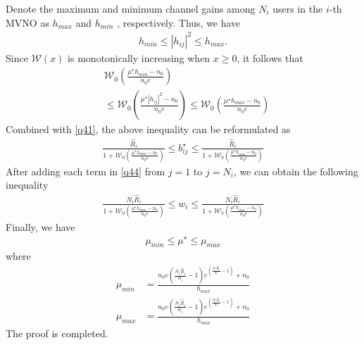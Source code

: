 \documentclass[journal]{IEEEtran}
\begin{document}
Denote the maximum and minimum channel gains among $N_i$ users in the $i$-th MVNO as $h_{max}$ and $h_{min}$  , respectively. Thus, we have
\begin{align}
h_{min} \leq \left|h_{ij}\right|^2 \leq h_{max}.
\end{align}
Since $\mathcal{W}\left(x\right)$ is monotonically increasing when $x \geq 0$, it follows that
\begin{align}
&\mathcal{W}_0\left(\frac{\mu^\star h_{min} - n_0}{n_0e}\right) \nonumber \\ & \leq  \mathcal{W}_0 \left(\frac{\mu^\star\left|h_{ij}\right|^2 - n_0}{n_0e}\right) \leq  \mathcal{W}_0\left(\frac{\mu^\star h_{max} - n_0}{n_0e}\right)
\end{align}
Combined with \eqref{q41}, the above inequality can be reformulated as
\begin{align}
\frac{\hat{R}_i}{1 + \mathcal{W}_0\left(\frac{\mu^\star h_{max} - n_0}{n_0e}\right)} \leq b_{ij}^\star \leq \frac{\hat{R}_i}{1 + \mathcal{W}_0\left(\frac{\mu^\star h_{min} - n_0}{n_0e}\right)} \label{q44}
\end{align}
After adding each term in \eqref{q44} from $j = 1$ to $j = N_i$, we can obtain the following inequality
\begin{align}
\frac{N_i\hat{R}_i}{1 + \mathcal{W}_0\left(\frac{\mu^\star h_{max} - n_0}{n_0e}\right)} \leq w_{i} \leq \frac{N_i\hat{R}_i}{1 + \mathcal{W}_0\left(\frac{\mu^\star h_{min} - n_0}{n_0e}\right)} 
\end{align}
Finally, we have
\begin{align}
\mu_{min} \leq \mu^\star \leq \mu_{max}
\end{align}
where 
\begin{align}
\mu_{min} &= \frac{n_0e\left(\frac{N_i\hat{R}_i}{w_i} - 1\right)e^{\left(\frac{N_i\hat{R}_i}{w_i} - 1\right)} + n_0}{h_{max}}  \\
\mu_{max} & = \frac{n_0e\left(\frac{N_i\hat{R}_i}{w_i} - 1\right)e^{\left(\frac{N_i\hat{R}_i}{w_i} - 1\right)} + n_0}{h_{min}}
\end{align}
The proof is completed.
 
\end{document}
